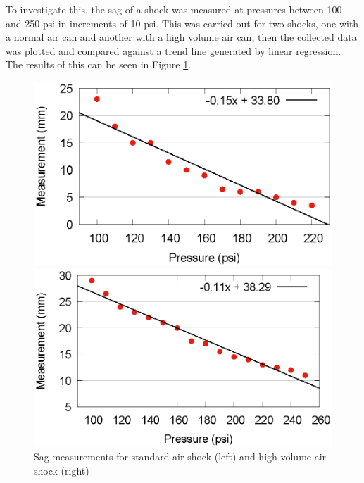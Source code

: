 			To investigate this, the sag of a shock was measured at pressures between 100 and 250 psi in increments of 10 psi. This was carried out for two shocks, one with a normal air can and another with a high volume air can, then the collected data was plotted and compared against a trend line generated by linear regression. The results of this can be seen in Figure \ref{fig:scatters}.
			\begin{figure}[h!]
				\centering
				\begin{minipage}{0.4\textwidth}
					\centering
					\includegraphics[width=\textwidth]{../images/results/fox_scatter.eps}
				\end{minipage}
				\begin{minipage}{0.4\textwidth}
					\centering
					\includegraphics[width=\textwidth]{../images/results/rs_scatter.eps}
				\end{minipage}
				\caption{Sag measurements for standard air shock (left) and high volume air shock (right)}
				\label{fig:scatters}
			\end{figure}\\
